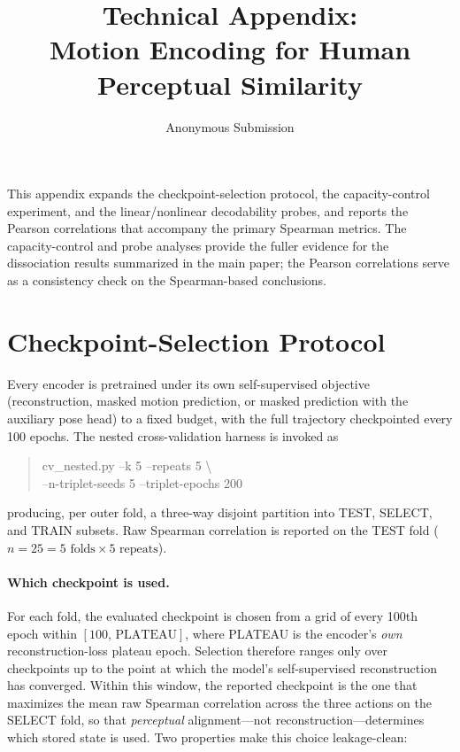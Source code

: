 \documentclass[letterpaper]{article} %
\title{Technical Appendix:\\ Motion Encoding for Human Perceptual Similarity}
\author{Anonymous Submission}
\begin{document}
\maketitle

\noindent This appendix expands the checkpoint-selection protocol, the
capacity-control experiment, and the linear/nonlinear decodability probes, and reports the Pearson
correlations that accompany the primary Spearman metrics. The capacity-control and probe analyses
provide the fuller evidence for the dissociation results summarized in the main paper; the Pearson
correlations serve as a consistency check on the Spearman-based conclusions.

\section{Checkpoint-Selection Protocol}
\label{app:checkpoint}

Every encoder is pretrained under its own self-supervised objective (reconstruction, masked motion
prediction, or masked prediction with the auxiliary pose head) to a fixed budget, with the full
trajectory checkpointed every 100 epochs. The nested cross-validation harness is invoked as
\begin{quote}\ttfamily\small
cv\_nested.py --k 5 --repeats 5 \textbackslash\\
\hspace*{1.5em}--n-triplet-seeds 5 --triplet-epochs 200
\end{quote}
producing, per outer fold, a three-way disjoint partition into TEST, SELECT, and TRAIN subsets. Raw
Spearman correlation is reported on the TEST fold ($n=25 = 5\text{ folds} \times 5\text{ repeats}$).

\paragraph{Which checkpoint is used.}
For each fold, the evaluated checkpoint is chosen from a grid of every 100th epoch within
$[100,\,\mathrm{PLATEAU}]$, where PLATEAU is the encoder's \emph{own} reconstruction-loss plateau
epoch. Selection therefore ranges only over checkpoints up to the point at which the model's
self-supervised reconstruction has converged. Within this window, the reported checkpoint is the one
that maximizes the mean raw Spearman correlation across the three actions on the SELECT fold, so that
\emph{perceptual} alignment---not reconstruction---determines which stored state is used. Two properties
make this choice leakage-clean:
\end{document}
